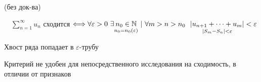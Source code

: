 \documentclass[12pt]{article}
\begin{document}
    \begin{MyTheorem}
        \Ths (без док-ва) 
        
        $\quad \sum_{n = 1}^\infty u_n$ сходится $\Longleftrightarrow \forall \varepsilon > 0 \ \exists \underset{n_0 = n_0 (\varepsilon)}{n_0 \in \mathbb{N}} \ | \ \forall m > n > n_0 \ \ \underset{|S_m - S_n| < \varepsilon}{|u_{n + 1} + \dots + u_m|} < \varepsilon$
    \end{MyTheorem}

    \Nota Хвост ряда попадает в $\varepsilon$-трубу

    \Notas Критерий не удобен для непосредственного исследования на сходимость, в отличии от признаков
\end{document}

